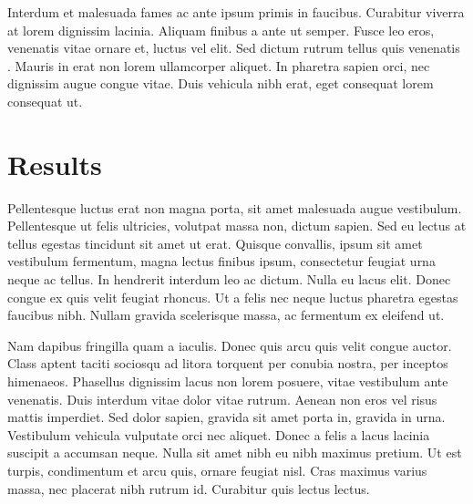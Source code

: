 \documentclass[onecolumn]{article}
\begin{document}
Interdum et malesuada fames ac ante ipsum primis in faucibus. Curabitur
viverra at lorem dignissim lacinia. Aliquam finibus a ante ut semper. Fusce
leo eros, venenatis vitae ornare et, luctus vel elit. Sed dictum rutrum
tellus quis venenatis\unskip~\cite{572698:13280063} . Mauris in erat non
lorem ullamcorper aliquet. In pharetra sapien orci, nec dignissim augue
congue vitae. Duis vehicula nibh erat, eget consequat lorem consequat ut.


    
\section*{Results}
Pellentesque luctus erat non magna porta, sit amet malesuada augue
vestibulum. Pellentesque ut felis ultricies, volutpat massa non, dictum
sapien. Sed eu lectus at tellus egestas tincidunt sit amet ut erat. Quisque
convallis, ipsum sit amet vestibulum fermentum, magna lectus finibus ipsum,
consectetur feugiat urna neque ac tellus. In hendrerit interdum leo ac
dictum. Nulla eu lacus elit. Donec congue ex quis velit feugiat rhoncus. Ut
a felis nec neque luctus pharetra egestas faucibus nibh. Nullam gravida
scelerisque massa, ac fermentum ex eleifend ut.

Nam dapibus fringilla quam a iaculis. Donec quis arcu quis velit congue
auctor. Class aptent taciti sociosqu ad litora torquent per conubia nostra,
per inceptos himenaeos. Phasellus dignissim lacus non lorem posuere, vitae
vestibulum ante venenatis. Duis interdum vitae dolor vitae rutrum. Aenean
non eros vel risus mattis imperdiet. Sed dolor sapien, gravida sit amet
porta in, gravida in urna. Vestibulum vehicula vulputate orci nec aliquet.
Donec a felis a lacus lacinia suscipit a accumsan neque. Nulla sit amet
nibh eu nibh maximus pretium. Ut est turpis, condimentum et arcu quis,
ornare feugiat nisl. Cras maximus varius massa, nec placerat nibh rutrum
id. Curabitur quis lectus lectus.
\end{document}
